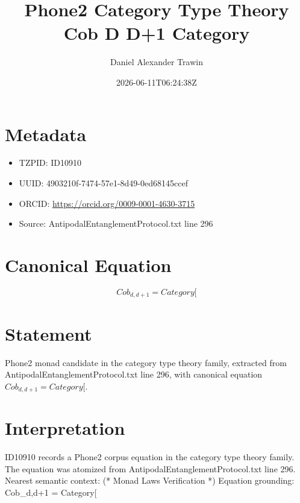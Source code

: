 \documentclass[11pt]{article}
\title{Phone2 Category Type Theory Cob D D+1 Category}
\author{Daniel Alexander Trawin}
\date{2026-06-11T06:24:38Z}
\begin{document}
\maketitle
\section*{Metadata}
\begin{itemize}
\item TZPID: ID10910
\item UUID: 4903210f-7474-57e1-8d49-0ed68145ccef
\item ORCID: \url{https://orcid.org/0009-0001-4630-3715}
\item Source: AntipodalEntanglementProtocol.txt line 296
\end{itemize}
\section*{Canonical Equation}
\[
Cob_{d,d+1} = Category[
\]
\section*{Statement}
Phone2 monad candidate in the category type theory family, extracted from AntipodalEntanglementProtocol.txt line 296, with canonical equation $Cob_{d,d+1} = Category[$.
\section*{Interpretation}
ID10910 records a Phone2 corpus equation in the category type theory family. The equation was atomized from AntipodalEntanglementProtocol.txt line 296. Nearest semantic context: (* Monad Laws Verification *) Equation grounding: Cob_{d,d+1} = Category[
\end{document}
